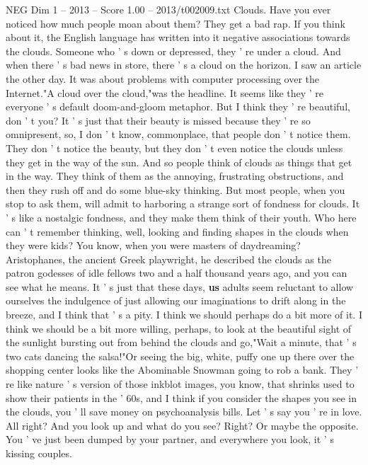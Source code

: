 \begin{textsample}{NEG Dim 1 – 2013 – Score 1.00 – 2013/t002009.txt}  \label{ex:f1_neg_038}
Clouds.
Have you ever noticed how much people moan about them?
They get a bad rap.
If you think about it, the English language has written into it negative associations towards the clouds.
Someone who ' s down or depressed, they ' re under a cloud.
And when there ' s bad news in store, there ' s a cloud on the horizon.
I saw an article the other day.
It was about problems with computer processing over the Internet."A cloud over the cloud,"was the headline.
It seems like they ' re everyone ' s default doom-and-gloom metaphor.
But I think they ' re beautiful, don ' t you?
It ' s just that their beauty is missed because they ' re so omnipresent, so, I don ' t know, commonplace, that people don ' t notice them.
They don ' t notice the beauty, but they don ' t even notice the clouds unless they get in the way of the sun.
And so people think of clouds as things that get in the way.
They think of them as the annoying, frustrating obstructions, and then they rush off and do some blue-sky thinking.
But most people, when you stop to ask them, will admit to harboring a strange sort of fondness for clouds.
It ' s like a nostalgic fondness, and they make them think of their youth.
Who here can ' t remember thinking, well, looking and finding shapes in the clouds when they were kids?
You know, when you were masters of daydreaming?
Aristophanes, the ancient Greek playwright, he described the clouds as the patron godesses of idle fellows two and a half thousand years ago, and you can see what he means.
It ' s just that these days, \textbf{us} adults seem reluctant to allow ourselves the indulgence of just allowing our imaginations to drift along in the breeze, and I think that ' s a pity.
I think we should perhaps do a bit more of it.
I think we should be a bit more willing, perhaps, to look at the beautiful sight of the sunlight bursting out from behind the clouds and go,"Wait a minute, that ' s two cats dancing the salsa!"Or seeing the big, white, puffy one up there over the shopping center looks like the Abominable Snowman going to rob a bank.
They ' re like nature ' s version of those inkblot images, you know, that shrinks used to show their patients in the ' 60s, and I think if you consider the shapes you see in the clouds, you ' ll save money on psychoanalysis bills.
Let ' s say you ' re in love.
All right?
And you look up and what do you see?
Right?
Or maybe the opposite.
You ' ve just been dumped by your partner, and everywhere you look, it ' s kissing couples.

\end{textsample}
